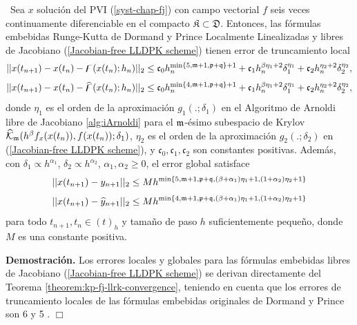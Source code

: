 \begin{theorem}\label{Teorema Convergencia}
	\cite{naranjo2022RT}~Sea $x$ solución del PVI (\ref{syst-chap-fj}) con campo vectorial $f$ seis veces continuamente diferenciable en el compacto $\mathfrak{K} \subset \mathfrak{D}$. Entonces, las fórmulas embebidas Runge-Kutta de Dormand y Prince Localmente Linealizadas y libres de Jacobiano (\ref{Jacobian-free LLDPK scheme}) tienen error de truncamiento local
	\[	\lvert\lvert x(t_{n+1}) - x(t_n) - \digamma(x(t_n);h_n) \rvert\rvert_2 \leq \mathfrak{c}_0h_n^{\min\{5,\mathfrak{m}+1,\mathfrak{p}+\mathfrak{q} \}+1} + \mathfrak{c}_1h_n^{\beta\eta_1+2}\delta_1^{\eta_1} + \mathfrak{c}_2h_n^{\eta_2+2}\delta_2^{\eta_2},
	\]
	\[	\lvert\lvert x(t_{n+1}) - x(t_n) - \widehat{\digamma }(x(t_n);h_n) \rvert\rvert_2 \leq \mathfrak{c}_0h_n^{\min\{4,\mathfrak{m}+1,\mathfrak{p}+\mathfrak{q} \}+1} + \mathfrak{c}_1h_n^{\beta\eta_1+2}\delta_1^{\eta_1} + \mathfrak{c}_2h_n^{\eta_2+2}\delta_2^{\eta_2},
	\]
	donde $\eta_1$ es el orden de la aproximación $g_1(.;\delta_1)$ en el Algoritmo de Arnoldi libre de Jacobiano \ref{alg:iArnoldi} para el $\mathfrak{m}$-ésimo subespacio de Krylov $\widehat{\mathcal{K}}_{\mathfrak{m}}(h^\beta f_x(x(t_n)),f(x(t_n));\delta_1)$, $\eta_2$ es el orden de la aproximación $g_2(.;\delta_2)$ en (\ref{Jacobian-free LLDPK scheme}), y $\mathfrak{c}_0,\mathfrak{c}_1,\mathfrak{c}_2$ son constantes positivas. Además, con $\delta_1\propto h^{\alpha_1}$, $\delta_2\propto h^{\alpha_2}$, $\alpha_1,\alpha_2 \geq 0$, el error global satisface
	\[ \lvert\lvert x(t_{n+1}) - y_{n+1} \rvert\rvert_2 \leq M h^{\mathrm{min}\left\{5,\mathfrak{m}+1,\mathfrak{p}+\mathfrak{q},(\beta+\alpha_1)\eta_1+1,(1+\alpha_2)\eta_2+1 \right\}} \]
	\[ \lvert\lvert x(t_{n+1}) - \widehat{y}_{n+1} \rvert\rvert_2 \leq M h^{\mathrm{min}\left\{4,\mathfrak{m}+1,\mathfrak{p}+\mathfrak{q},(\beta+\alpha_1)\eta_1+1,(1+\alpha_2)\eta_2+1 \right\}} \]
	para todo $t_{n+1},t_n\in(t)_h$ y tamaño de paso $h$ suficientemente pequeño, donde $M$ es una constante positiva.
\end{theorem}

\textbf{Demostración.}
Los errores locales y globales para las fórmulas embebidas libres de Jacobiano (\ref{Jacobian-free LLDPK scheme}) se derivan directamente del Teorema \ref{theorem:kp-fj-llrk-convergence}, teniendo en cuenta que los errores de truncamiento locales de las fórmulas embebidas originales de Dormand y Prince son 6 y 5 \cite{hairer1993solving}.
$\Box$


